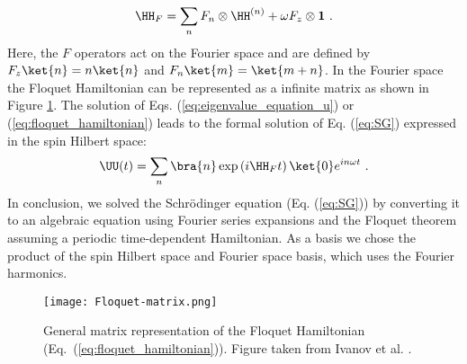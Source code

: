 \begin{align}
\HH_F= \sum_{n} F_n\otimes\HH^{(n)} +\omega F_z\otimes \mathbf{1}~.
\label{eq:floquet_hamiltonian}
\end{align}
Here, the $F$ operators act on the Fourier space and are defined by $F_z\ket{n}=n\ket{n}$ and $F_n\ket{m}=\ket{m+n}$. In the Fourier space the Floquet Hamiltonian can be represented as a infinite matrix as shown in Figure \ref{fig:floquet-matrix}. %
The solution of  Eqs. (\ref{eq:eigenvalue_equation_u}) or (\ref{eq:floquet_hamiltonian}) leads to the formal solution of Eq. (\ref{eq:SG}) expressed in the spin Hilbert space:
\begin{align}
\UU(t) =  \sum_{n} \bra{n}\exp\left(i \HH_F t\right)\ket{0} e^{i n \omega t}~.
\end{align}
In conclusion, we solved the Schr\"{o}dinger equation (Eq. (\ref{eq:SG})) by  converting it to an algebraic equation using Fourier series expansions and the Floquet theorem assuming a periodic time-dependent Hamiltonian. As a basis we chose the product of the spin Hilbert space and Fourier space basis, which uses the Fourier harmonics.
\begin{figure}[H]
  \centering
  \texttt{[image: Floquet-matrix.png]}
  \caption{\label{fig:floquet-matrix} General matrix representation of the Floquet Hamiltonian (Eq.~(\ref{eq:floquet_hamiltonian})). Figure taken from Ivanov et al. \cite{Ivanov:2021uy}.}
\end{figure}

